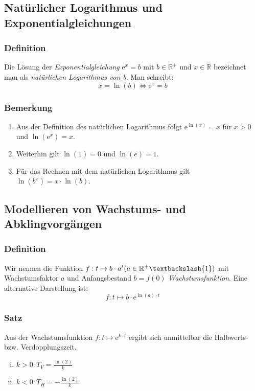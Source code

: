 \documentclass[a4paper,12pt]{article}
\newcommand{\R}{\mathbb{R}}
\newcommand{\e}{\mathrm{e}}
\begin{document}
\subsection{Natürlicher Logarithmus und Exponentialgleichungen}
\subsubsection{Definition}
Die Lösung der \emph{Exponentialgleichung} $\e^x = b$  mit $b \in \R ^+$ und $x \in \R$ bezeichnet man als \emph{natürlichen Logarithmus von b}. Man schreibt:
\[ x = \ln (b) \Leftrightarrow  \e^x = b \]

\subsubsection{Bemerkung}
\begin{enumerate}[(1)]
\item Aus der Definition des natürlichen Logarithmus folgt $\e^{\ln(x)}=x$ für $x>0$ und $\ln(\e^x)=x$.
\item Weiterhin gilt $\ln(1)=0$ und $\ln(e)=1$.
\item Für das Rechnen mit dem natürlichen Logarithmus gilt $\ln(b^x)=x\cdot \ln(b)$.
\end{enumerate}

\subsection{Modellieren von Wachstums- und Abklingvorgängen}
\subsubsection{Definition}
Wir nennen die Funktion $f:t\mapsto b \cdot a^t (a\in\R^+ \textbackslash \{ 1 \} )$ mit Wachstumsfaktor $a$ und Anfangsbestand $b=f(0)$ \emph{Wachstumsfunktion}. Eine alternative Darstellung ist:
\[ f:t\mapsto b \cdot \e^{\ln(a)\cdot t}  \] 

\subsubsection{Satz}
Aus der Wachstumsfunktion $f:t\mapsto \e^{k\cdot t}$ ergibt sich unmittelbar die Halbwerts- bzw. Verdopplungszeit.
\begin{enumerate}[(i)]
\item $k>0: T_V=\frac{\ln(2)}{k}$
\item $k<0: T_H=-\frac{\ln(2)}{k}$
\end{enumerate}
\end{document}
